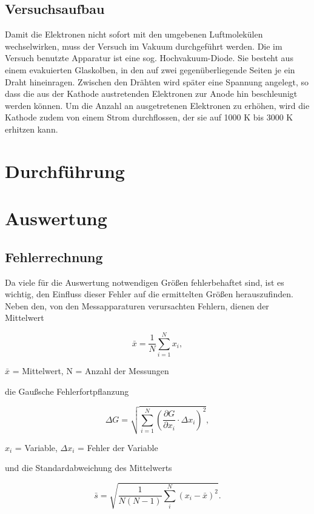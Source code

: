 \subsection{Versuchsaufbau}
Damit die Elektronen nicht sofort mit den umgebenen Luftmolekülen wechselwirken, muss der Versuch im Vakuum durchgeführt werden. Die im Versuch benutzte Apparatur ist eine sog. Hochvakuum-Diode. Sie besteht aus einem evakuierten Glaskolben, in den auf zwei gegenüberliegende Seiten je ein Draht hineinragen. Zwischen den Drähten wird später eine Spannung angelegt, so dass die aus der Kathode austretenden Elektronen zur Anode hin beschleunigt werden können. Um die Anzahl an ausgetretenen Elektronen zu erhöhen, wird die Kathode zudem von einem Strom durchflossen, der sie auf 1000 K bis 3000 K erhitzen kann. 
\section{Durchführung}

\section{Auswertung}
\subsection{Fehlerrechnung}
Da viele für die Auswertung notwendigen Größen fehlerbehaftet sind, ist es wichtig, den Einfluss dieser Fehler auf die ermittelten
Größen herauszufinden. Neben den, von den Messapparaturen verursachten Fehlern, dienen der Mittelwert
\begin{formel}
\begin{equation}
 \bar{x} = \frac1N \sum_{i=1}^{N} x_i,
\end{equation}
\caption*{\small{$\bar{x}$ = Mittelwert, N = Anzahl der Messungen}}
\end{formel}

die Gaußsche Fehlerfortpflanzung

\begin{formel}
\begin{equation}
\Delta G = \sqrt{\sum_{i=1}^{N}\left( \frac{\partial G}{\partial x_i}\cdot \Delta x_i\right)^2},
\label{gauss}
\end{equation}
\caption*{$x_i$ = Variable, $\Delta x_i$ = Fehler der Variable}
\end{formel}

und die Standardabweichung des Mittelwerts

\begin{equation}
 \bar s = \sqrt{\frac{1}{N(N-1)} \sum_{i}^{N} (x_i - \bar{x})^2}.
\end{equation}

